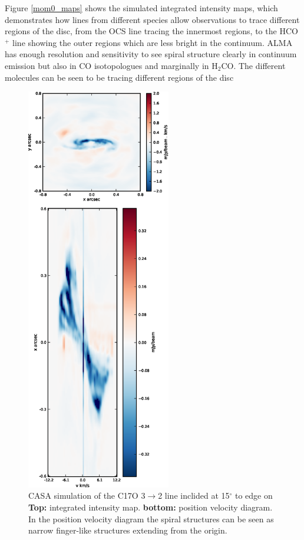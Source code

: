 \documentclass[useAMS,usenatbib]{mn2e}
\begin{document}
Figure \ref{mom0_maps} shows the simulated integrated intensity maps, which demonstrates how lines from different species allow observations to trace different regions of the disc, from the OCS line tracing the innermost regions, to the HCO$^+$ line showing the outer regions which are less bright in the continuum. ALMA has enough resolution and sensitivity to see spiral structure clearly in continuum emission but also in CO isotopologues and marginally in H$_2$CO. The different molecules can be seen to be tracing different regions of the disc\smallskip

\begin{figure}
 \includegraphics[width=63mm]{Figures/sim/casa_C17O_15deg_all.eps}

 \caption{CASA simulation of the C17O 3$\rightarrow$2 line inclided at 15$^\circ$ to edge on {\bf Top:} integrated intensity map. {\bf bottom:} position velocity diagram. In the position velocity diagram the spiral structures can be seen as narrow finger-like structures extending from the origin.}
 \label{15deg}
\end{figure}
\end{document}
